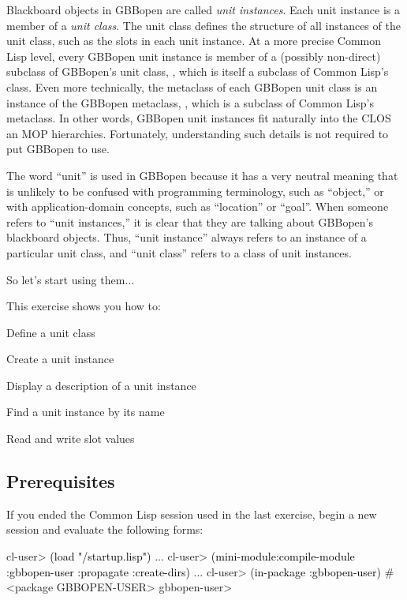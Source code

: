 \documentclass[10pt,twoside,english,pdftex]{article}
\begin{document}
Blackboard objects in GBBopen are called \textit{unit instances}. Each unit
instance is a member of a \textit{unit class}.  The unit class defines the
structure of all instances of the unit class, such as the slots in each unit
instance.  At a more precise Common Lisp level, every GBBopen unit instance is
member of a (possibly non-direct) subclass of GBBopen's unit class,
, which is itself a subclass of Common Lisp's
 class.  Even more technically, the metaclass of each
GBBopen unit class is an instance of the GBBopen metaclass,
, which is a subclass of Common Lisp's
 metaclass.  In other words, GBBopen unit instances fit
naturally into the CLOS an MOP hierarchies. Fortunately, understanding such
details is not required to put GBBopen to use.

The word ``unit'' is used in GBBopen because it has a very neutral meaning
that is unlikely to be confused with programming terminology, such as
``object,'' or with application-domain concepts, such as ``location'' or
``goal''.  When someone refers to ``unit instances,'' it is clear that they
are talking about GBBopen's blackboard objects.  Thus, ``unit instance''
always refers to an instance of a particular unit class, and ``unit class''
refers to a class of unit instances.

So let's start using them$\ldots$

\fndocrule

This exercise shows you how to:
\begin{tightitemize}
\item Define a unit class
\item Create a unit instance
\item Display a description of a unit instance
\item Find a unit instance by its name
\item Read and write slot values
\end{tightitemize}

\fndocrule

\subsection*{Prerequisites}

%
%
If you ended the Common Lisp session used in the last exercise, begin a new
session and evaluate the following forms:
%
\W\supp
\begin{example}
\textcolor{darkergray}{%
  cl-user> \textcolor{black}{(load "/startup.lisp")}
     ...
  cl-user> \textcolor{black}{(mini-module:compile-module :gbbopen-user :propagate :create-dirs)}
     ...
  cl-user> \textcolor{black}{(in-package :gbbopen-user)}
  #<package GBBOPEN-USER>
  gbbopen-user>}
\end{example}
\end{document}

